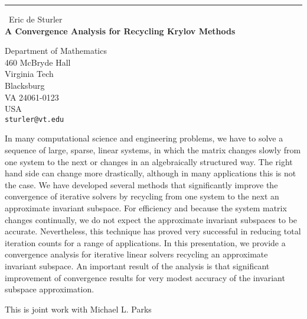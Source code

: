 \documentclass{report}
\begin{document}
\begin{center}
\rule{6in}{1pt} \
{\large Eric de Sturler \\
{\bf A Convergence Analysis for Recycling Krylov Methods}}

Department of Mathematics \\ 460 McBryde Hall \\ Virginia Tech \\ Blacksburg \\ VA 24061-0123 \\ USA
\\
{\tt sturler@vt.edu}\end{center}

In many computational science and engineering problems, we have
to solve a sequence of large, sparse, linear systems, in which
the matrix changes slowly from one system to the next or
changes in an algebraically structured way. The right hand side
can change more drastically, although in many applications this
is not the case. We have developed several methods that
significantly improve the convergence of iterative solvers by
recycling from one system to the next an approximate invariant
subspace. For efficiency and because the system matrix changes
continually, we do not expect the approximate invariant
subspaces to be accurate. Nevertheless, this technique has
proved very successful in reducing total iteration counts for a
range of applications. In this presentation, we provide a
convergence analysis for iterative linear solvers recycling an
approximate invariant subspace. An important result of the
analysis is that significant improvement of convergence results
for very modest accuracy of the invariant subspace
approximation.

This is joint work with Michael L. Parks
\end{document}
